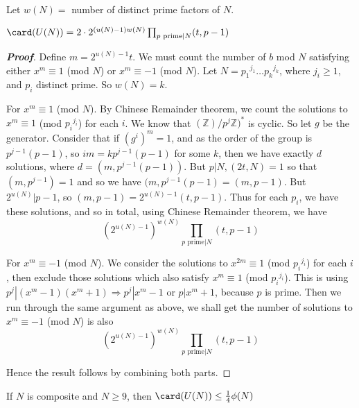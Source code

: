 \begin{definition} Let $w(N)=$ number of distinct prime factors of $N$.
\end{definition}
\begin{theorem} $\card(U(N)) = 2 \cdot 2^{(u(N)-1)w(N)}\prod_{p \text{ prime}|N}(t,p-1)$
\end{theorem}
\begin{proof}[\bf Proof] Define $m=2^{u(N)-1}t$. We must count the number of $b$ mod $N$ satisfying either
$x^m \equiv 1$ (mod $N$) or $x^m \equiv -1$ (mod $N$). Let $N={p_1}^{j_1} \ldots {p_k}^{j_k}$, where $j_i \ge 1$, and $p_i$ distinct prime. So $w(N)=k$.

For $x^m \equiv 1$ (mod $N$). By Chinese Remainder theorem, we count the solutions to $x^m \equiv 1$ (mod ${p_i}^{j_i}$) for each $i$. We know that $(\mathbb{Z})/{p}^{j}\mathbb{Z})^*$ is cyclic. So let $g$ be the generator. Consider that if $(g^i)^m=1$, and as the order of the group is $p^{j-1}(p-1)$, so $im=kp^{j-1}(p-1)$ for some $k$, then we have exactly $d$ solutions, where $d=(m,p^{j-1}(p-1))$.
But $p|N, (2t,N)=1$ so that $(m,p^{j-1})=1$ and so we have $(m,p^{j-1}(p-1)=(m,p-1)$.
But $2^{u(N)} | p-1$, so $(m,p-1)=2^{u(N)-1}(t,p-1)$. Thus for each $p_i$, we have these solutions, and so in total, using Chinese Remainder theorem, we have $$(2^{u(N)-1})^{w(N)}\prod_{p \text{ prime}|N}(t,p-1)$$

For $x^m \equiv -1$ (mod $N$). We consider the solutions to $x^{2m} \equiv 1$ (mod ${p_i}^{j_i}$) for each $i$, then exclude those solutions which also satisfy $x^{m} \equiv 1$ (mod ${p_i}^{j_i}$). This is using $p^j|(x^m-1)(x^m+1) \Rightarrow p^j |x^m-1$ or $p|x^m+1$, because $p$ is prime.
Then we run through the same argument as above, we shall get the number of solutions to $x^m \equiv -1$ (mod $N$) is also $$(2^{u(N)-1})^{w(N)} \prod_{p \text{ prime}|N}(t,p-1)$$

Hence the result follows by combining both parts.
\end{proof}
\begin{corollary} If $N$ is composite and $N \ge 9$, then $\card(U(N)) \le \frac{1}{4} \phi(N)$
\end{corollary}
